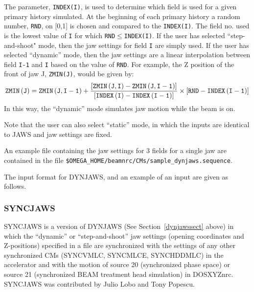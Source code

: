 \documentclass[12pt,twoside]{article}
\begin{document}
The parameter, {\tt INDEX(I)}, is used to determine which field is used
for a given primary history simulated.  At the beginning of each primary
history a random number, {\tt RND}, on [0,1] is chosen and compared to
the {\tt INDEX(I)}.  The field no. used is the lowest value of {\tt I} for
which {\tt RND}$\leq${\tt INDEX(I)}.  If the user has selected ``step-and-shoot" mode,
then the jaw settings for field {\tt I} are simply used.  If the user has
selected ``dynamic'' mode, then the jaw settings are a linear interpolation between
field {\tt I-1} and {\tt I} based on the value of {\tt RND}.  For example, the
Z position of the front of jaw J, {\tt ZMIN(J)}, would be given by:
\begin{equation}
{\tt
ZMIN\left(J\right)=ZMIN\left(J,I-1\right)+\frac{\left[ZMIN\left(J,I\right)-ZMIN\left(J,I-1\right)\right]}
{\left[INDEX\left(I\right)-INDEX\left(I-1\right)\right]}\times\left[RND-INDEX\left(I-1\right)\right]
}
\end{equation}
In this way, the ``dynamic'' mode simulates jaw motion while the beam is
on.

Note that the user can also select ``static'' mode, in which the inputs are identical
to JAWS and jaw settings are fixed.

An example file containing the jaw settings for 3 fields for a single jaw are contained in
the file {\tt \$OMEGA\_HOME/beamnrc/CMs/sample\_dynjaws.sequence}.

The input format for DYNJAWS, and an example of an input are
given as follows.

\begin{small}

\end{small}

\clearpage
\vspace*{-1cm}
\subsubsection{SYNCJAWS}
\renewcommand{\rightmark}{SYNCJAWS CM}
SYNCJAWS is a version of DYNJAWS (See Section~\ref{dynjawssect} above) in which the
``dynamic'' or ``step-and-shoot'' jaw settings (opening coordinates and Z-positions) specified
in a file are synchronized with the settings of any other synchronized CMs (SYNCVMLC, SYNCMLCE,
SYNCHDDMLC) in the accelerator and with the motion of source 20 (synchronized phase space) or
source 21 (synchronized BEAM treatment head simulation) in DOSXYZnrc\cite{Wa05}.  SYNCJAWS was
contributed by Julio Lobo and Tony Popescu\cite{LP10}.
\end{document}
